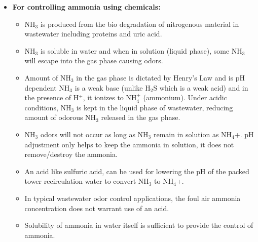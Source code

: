 \begin{enumerate}
\begin{itemize}
\item \textbf{For controlling ammonia using chemicals:}\\
\begin{itemize}
\item NH$_3$ is produced from the bio degradation of nitrogenous material in wastewater including proteins and uric acid.
\item NH$_3$ is soluble in water and when in solution (liquid phase), some NH$_3$ will escape into the gas phase causing odors.
\item Amount of NH$_3$ in the gas phase is dictated by Henry’s Law and is pH dependent
NH$_3$ is a weak base (unlike H$_2$S which is a weak acid) and in the presence of H$^+$, it ionizes to NH$_4^+$ (ammonium).
Under acidic conditions, NH$_3$ is kept in the liquid phase of wastewater, reducing amount of odorous NH$_3$  released in the gas phase.
\item NH$_3$ odors will not occur as long as NH$_3$ remain in solution as NH$_4$+.
pH adjustment only helps to keep the ammonia in solution, it does not remove/destroy the ammonia.
\end{itemize}

\begin{itemize}
\item An acid like sulfuric acid, can be used for lowering the pH of the packed tower recirculation water to convert NH$_3$ to NH$_4$+.
\item In typical wastewater odor control applications, the foul air ammonia concentration does not warrant use of an acid.
\item Solubility of ammonia in water itself is sufficient to provide the control of ammonia.
\end{itemize}


\end{itemize}
\end{enumerate}
